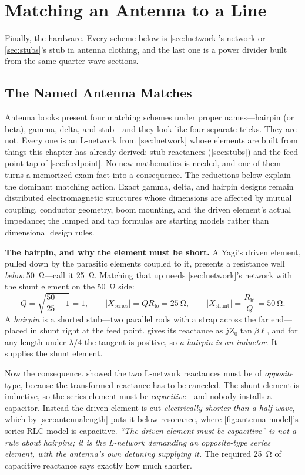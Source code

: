 \section{Matching an Antenna to a Line}
Finally, the hardware. Every scheme below is \cref{sec:lnetwork}'s network or
\cref{sec:stubs}'s stub in antenna clothing, and the last one is a power divider
built from the same quarter-wave sections.

\subsection{The Named Antenna Matches}
\label{sec:antennamatches}
Antenna books present four matching schemes under proper names---hairpin (or beta),
gamma, delta, and stub---and they look like four separate tricks. They are not. Every
one is an L-network from \cref{sec:lnetwork} whose elements are built from things this
chapter has already derived: stub reactances (\cref{sec:stubs}) and the feed-point
tap of \cref{sec:feedpoint}. No new mathematics is needed, and one of them turns a
memorized exam fact into a consequence. The reductions below explain the dominant
matching action. Exact gamma, delta, and hairpin designs remain distributed
electromagnetic structures whose dimensions are affected by mutual coupling, conductor
geometry, boom mounting, and the driven element's actual impedance; the lumped and tap
formulas are starting models rather than dimensional design rules.

\textbf{The hairpin, and why the element must be short.} A Yagi's driven element,
pulled down by the parasitic elements coupled to it, presents a resistance well
\emph{below} \SI{50}{\ohm}---call it \SI{25}{\ohm}. Matching that up needs
\cref{sec:lnetwork}'s network with the shunt element on the \SI{50}{\ohm} side:
\[
Q=\sqrt{\frac{50}{25}-1}=1,
\qquad
|X_{\text{series}}|=QR_{\text{lo}}=\SI{25}{\ohm},
\qquad
|X_{\text{shunt}}|=\frac{R_{\text{hi}}}{Q}=\SI{50}{\ohm}.
\]
A \emph{hairpin} is a shorted stub---two parallel rods with a strap across the far
end---placed in shunt right at the feed point.  gives its reactance as
\(\jj Z_0\tan\beta\ell\), and for any length under \(\lambda/4\) the tangent is
positive, so \emph{a hairpin is an inductor}. It supplies the shunt element.

Now the consequence.  showed the two L-network reactances must be of
\emph{opposite} type, because the transformed reactance has to be canceled. The shunt
element is inductive, so the series element must be \emph{capacitive}---and nobody
installs a capacitor. Instead the driven element is cut \emph{electrically shorter
than a half wave}, which by \cref{sec:antennalength} puts it below resonance, where
\cref{fig:antenna-model}'s series-RLC model is capacitive. \emph{``The driven element
must be capacitive'' is not a rule about hairpins; it is the L-network demanding an
opposite-type series element, with the antenna's own detuning supplying it.} The
required \SI{25}{\ohm} of capacitive reactance says exactly how much shorter.

